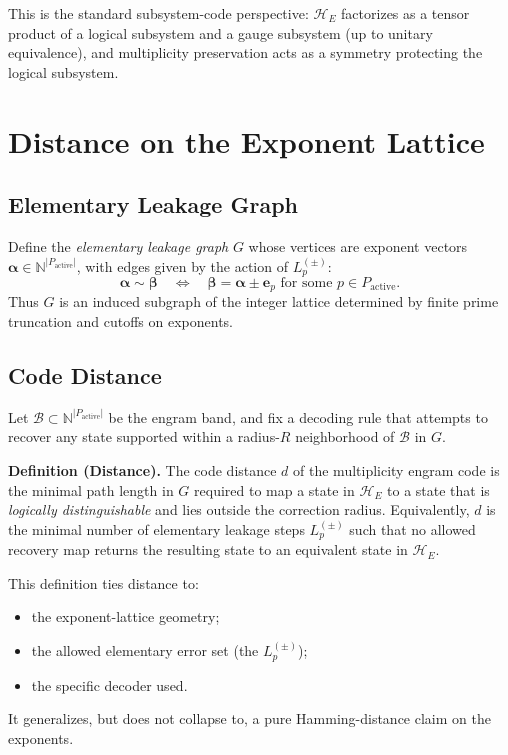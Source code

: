 \documentclass[11pt]{article}
\begin{document}
This is the standard subsystem-code perspective: $\mathcal H_E$ factorizes
as a tensor product of a logical subsystem and a gauge subsystem (up to
unitary equivalence), and multiplicity preservation acts as a symmetry
protecting the logical subsystem.

\section{Distance on the Exponent Lattice}

\subsection{Elementary Leakage Graph}

Define the \emph{elementary leakage graph} $G$ whose vertices are exponent
vectors $\boldsymbol\alpha \in \mathbb N^{|P_{\text{active}}|}$, with edges
given by the action of $L_p^{(\pm)}$:
\begin{equation}
  \boldsymbol\alpha \sim \boldsymbol\beta
  \quad \Leftrightarrow \quad
  \boldsymbol\beta = \boldsymbol\alpha \pm \boldsymbol e_p
  \text{ for some } p \in P_{\text{active}}.
\end{equation}
Thus $G$ is an induced subgraph of the integer lattice determined by
finite prime truncation and cutoffs on exponents.

\subsection{Code Distance}

Let $\mathcal B \subset \mathbb N^{|P_{\text{active}}|}$ be the engram band,
and fix a decoding rule that attempts to recover any state supported within
a radius-$R$ neighborhood of $\mathcal B$ in $G$.

\textbf{Definition (Distance).} The code distance $d$ of the multiplicity
engram code is the minimal path length in $G$ required to map a state in
$\mathcal H_E$ to a state that is \emph{logically distinguishable} and lies
outside the correction radius. Equivalently, $d$ is the minimal number of
elementary leakage steps $L_p^{(\pm)}$ such that no allowed recovery map
returns the resulting state to an equivalent state in $\mathcal H_E$.

This definition ties distance to:
\begin{itemize}[leftmargin=*]
  \item the exponent-lattice geometry;
  \item the allowed elementary error set (the $L_p^{(\pm)}$);
  \item the specific decoder used.
\end{itemize}
It generalizes, but does not collapse to, a pure Hamming-distance claim on
the exponents.
\end{document}
